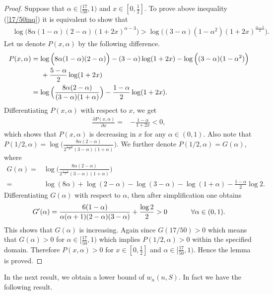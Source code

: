 \documentclass[12pt]{amsart}
\theoremstyle{definition}
\theoremstyle{plain}
\theoremstyle{definition}
\numberwithin{equation}{section}
\begin{document}
\begin{proof}
Suppose that $\alpha\in[\frac{17}{50}, 1)$ and $x\in[0,\frac{1}{2}]$. To prove above inequality (\ref{17/50inq}) it is equivalent to show that
\begin{align*}
 &\log\Big(8\alpha(1-\alpha)(2-\alpha)(1+2x)^{\alpha-3}\Big)>\log\Big((3-\alpha)(1-\alpha^{2})(1+2x)^{\frac{\alpha-5}{2}}\Big).
 \end{align*}
Let us denote $P(x,\alpha)$ by the following difference.
\begin{align*}
 P(x,\alpha)&=\log\Big(8\alpha(1-\alpha)(2-\alpha)\Big)-(3-\alpha)\log(1+2x)-\log\Big((3-\alpha)(1-\alpha^{2})\Big)\\
 & \hspace{0.5cm}+\frac{5-\alpha}{2}\log(1+2x)\\
&=\log\Big(\frac{8\alpha(2-\alpha)}{(3-\alpha)(1+\alpha)}\Big)-\frac{1-\alpha}{2}\log(1+2x).
 \end{align*}
Differentiating $P(x,\alpha)$ with respect to $x$, we get
\begin{align*}
\frac{\partial{P(x,\alpha)}}{\partial{x}}=&-\frac{1-\alpha}{1+2x}<0,
\end{align*}
which shows that $P(x,\alpha)$ is decreasing in $x$ for any $\alpha\in (0, 1)$. Also note that $P(1/2, \alpha)=\log\Big(\frac{8\alpha(2-\alpha)}{2^{\frac{1-\alpha}{2}}(3-\alpha)(1+\alpha)}\Big)$. We further denote $P(1/2, \alpha)=G(\alpha)$, where
\begin{align}
G(\alpha)=&\log\Big(\frac{8\alpha(2-\alpha)}{2^{\frac{1-\alpha}{2}}(3-\alpha)(1+\alpha)}\Big) \nonumber\\
=&\log(8\alpha)+\log(2-\alpha)-\log(3-\alpha)-\log(1+\alpha)-\frac{1-\alpha}{2}\log2.
\end{align}
Differentiating $G(\alpha)$ with respect to $\alpha$, then after simplification one obtains
\begin{align*}
G'(\alpha)=\frac{6(1-\alpha)}{\alpha(\alpha+1)(2-\alpha)(3-\alpha)}+\frac{\log2}{2}>0~~~~~~\hspace{0.5cm}\forall\alpha\in(0,1).
\end{align*}
This shows that $G(\alpha)$ is increasing. Again since $G(17/50)>0$ which means that $G(\alpha)>0$ for $\alpha\in[\frac{17}{50}, 1)$ which implies $P(1/2,\alpha)>0$ within the specified domain. Therefore $P(x, \alpha)>0$ for $x\in[0,\frac{1}{2}]$ and $\alpha\in[\frac{17}{50}, 1)$. Hence the lemma is proved.
\end{proof}
In the next result, we obtain a lower bound of $w_{n}(n, S)$. In fact we have the following result.
\end{document}
